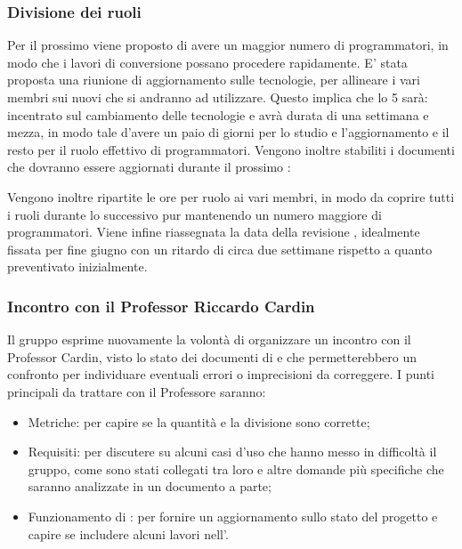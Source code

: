 \subsubsection{Divisione dei ruoli}
\par Per il prossimo  viene proposto di avere un maggior numero di programmatori, in modo che i lavori di conversione possano procedere rapidamente.
E' stata proposta una riunione di aggiornamento sulle tecnologie, per allineare i vari membri sui nuovi  che si andranno ad utilizzare.
Questo implica che lo  5 sarà: incentrato sul cambiamento delle tecnologie e avrà durata di una settimana e mezza, in modo tale d'avere un paio di giorni per lo studio e l'aggiornamento e il resto per il ruolo effettivo di programmatori.
Vengono inoltre stabiliti i documenti che dovranno essere aggiornati durante il prossimo :
Vengono inoltre ripartite le ore per ruolo ai vari membri, in modo da coprire tutti i ruoli durante lo  successivo pur mantenendo un numero maggiore di programmatori. Viene infine riassegnata la data della revisione \RTB, idealmente fissata per fine giugno con un ritardo di circa due settimane rispetto a quanto preventivato inizialmente.

\subsubsection{Incontro con il Professor Riccardo Cardin}
\par Il gruppo esprime nuovamente la volontà di organizzare un incontro con il Professor Cardin, visto lo stato dei documenti di \AdR e \PdQ che permetterebbero un confronto per individuare eventuali errori o imprecisioni da correggere.
I punti principali da trattare con il Professore saranno:
\begin{itemize}
	\item Metriche: per capire se la quantità e la divisione sono corrette;
	\item Requisiti: per discutere su alcuni casi d'uso che hanno messo in difficoltà il gruppo, come sono stati collegati tra loro e altre domande più specifiche che saranno analizzate in un documento a parte;
	\item Funzionamento di : per fornire un aggiornamento sullo stato del progetto e capire se includere alcuni lavori nell'\AdR.
\end{itemize}

